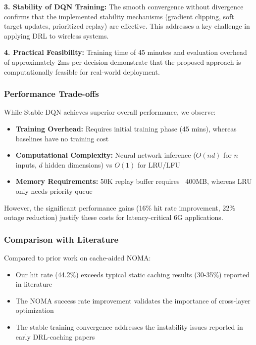 \documentclass[12pt,a4paper]{article}
\begin{document}
\textbf{3. Stability of DQN Training:} The smooth convergence without divergence confirms that the implemented stability mechanisms (gradient clipping, soft target updates, prioritized replay) are effective. This addresses a key challenge in applying DRL to wireless systems.

\textbf{4. Practical Feasibility:} Training time of 45 minutes and evaluation overhead of approximately 2ms per decision demonstrate that the proposed approach is computationally feasible for real-world deployment.

\subsubsection{Performance Trade-offs}

While Stable DQN achieves superior overall performance, we observe:
\begin{itemize}
    \item \textbf{Training Overhead:} Requires initial training phase (45 mins), whereas baselines have no training cost
    \item \textbf{Computational Complexity:} Neural network inference ($O(nd)$ for $n$ inputs, $d$ hidden dimensions) vs $O(1)$ for LRU/LFU
    \item \textbf{Memory Requirements:} 50K replay buffer requires ~400MB, whereas LRU only needs priority queue
\end{itemize}

However, the significant performance gains (16\% hit rate improvement, 22\% outage reduction) justify these costs for latency-critical 6G applications.

\subsubsection{Comparison with Literature}

Compared to prior work on cache-aided NOMA:
\begin{itemize}
    \item Our hit rate (44.2\%) exceeds typical static caching results (30-35\%) reported in literature \cite{cao2021joint}
    \item The NOMA success rate improvement validates the importance of cross-layer optimization
    \item The stable training convergence addresses the instability issues reported in early DRL-caching papers \cite{li2021deep}
\end{itemize}
\end{document}
